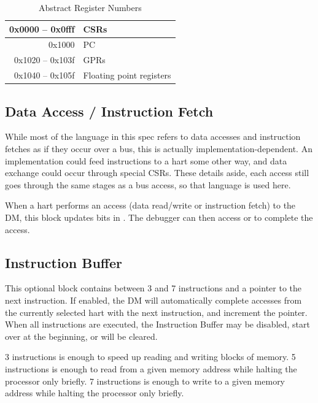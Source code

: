 \documentclass{article}
\begin{document}
\begin{table}[htp]
    \centering
    \caption{Abstract Register Numbers}
    \label{tab:regno}
    \begin{tabulary}{\textwidth}{|r|l|}
        \hline
        0x0000 -- 0x0fff & CSRs \\
        \hline
        0x1000 & PC \\
        \hline
        0x1020 -- 0x103f & GPRs \\
        \hline
        0x1040 -- 0x105f & Floating point registers \\
        \hline
    \end{tabulary}
\end{table}



\subsection{Data Access / Instruction Fetch}

While most of the language in this spec refers to data accesses and instruction
fetches as if they occur over a bus, this is actually implementation-dependent.
An implementation could feed instructions to a hart some other way, and data
exchange could occur through special CSRs. These details aside, each access
still goes through the same stages as a bus access, so that language is used
here.

When a hart performs an access (data read/write or instruction fetch) to the
DM, this block updates bits in \Raccesscs. The debugger can then access \Rdaccess
or \Rifetch to complete the access.

\subsection{Instruction Buffer}

This optional block contains between 3 and 7 instructions and a pointer to the
next instruction. If enabled, the DM will automatically complete accesses from
the currently selected hart with the next instruction, and increment the
pointer. When all instructions are executed, the Instruction Buffer may be
disabled, start over at the beginning, or \Fhalt will be cleared.

3 instructions is enough to speed up reading and writing blocks of memory.  5
instructions is enough to read from a given memory address while halting the
processor only briefly.  7 instructions is enough to write to a given memory
address while halting the processor only briefly.
\end{document}

